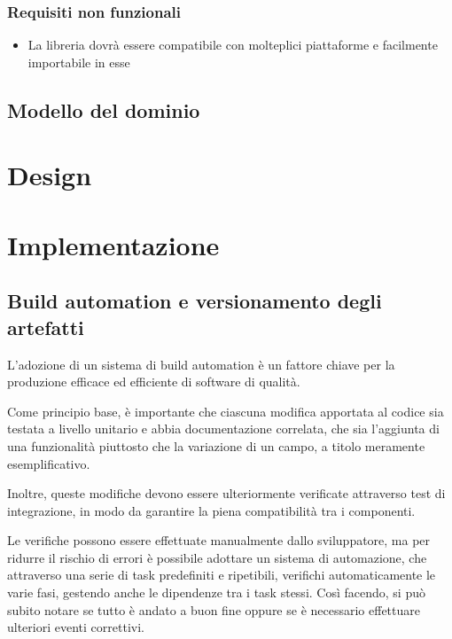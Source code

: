 \documentclass[12pt,a4paper,openright,twoside]{book}
\begin{document}
    \subsection{Requisiti non funzionali}
    \begin{itemize}
    \item{La libreria dovrà essere compatibile con molteplici piattaforme e facilmente importabile in esse}
    \end{itemize}


\section{Modello del dominio}
\chapter{Design}
\chapter{Implementazione}

\section{Build automation e versionamento degli artefatti}
L'adozione di un sistema di build automation è un fattore chiave per la produzione
efficace ed efficiente di software di qualità.

Come principio base, è importante che ciascuna modifica apportata al codice
sia testata a livello unitario e abbia documentazione correlata, che sia l'aggiunta 
di una funzionalità piuttosto che la variazione di un campo, a titolo meramente
esemplificativo. 

Inoltre, queste modifiche devono essere ulteriormente 
verificate attraverso test di integrazione, in modo da garantire la piena
compatibilità tra i componenti. 

Le verifiche possono essere effettuate 
manualmente dallo sviluppatore, ma per ridurre il rischio di errori è
possibile adottare un sistema di automazione, che attraverso una serie di task predefiniti
e ripetibili, verifichi automaticamente le varie fasi,
gestendo anche le dipendenze tra i task stessi.
Così facendo, si può subito notare se tutto è andato a buon fine oppure 
se è necessario effettuare ulteriori eventi correttivi.
\end{document}
